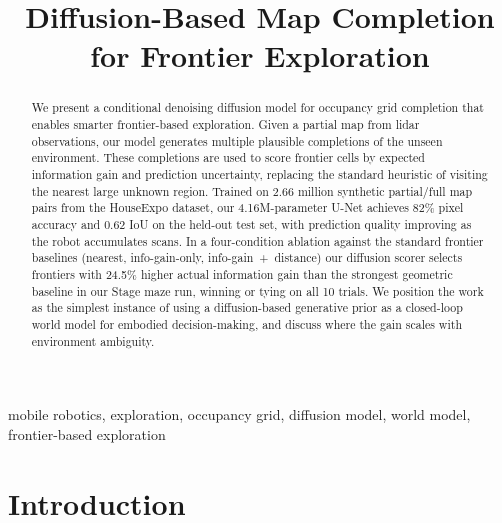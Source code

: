 \documentclass[conference]{IEEEtran}
\begin{document}
\title{Diffusion-Based Map Completion \\ for Frontier Exploration}

\author{
}

\maketitle

\begin{abstract}
We present a conditional denoising diffusion model for occupancy grid
completion that enables smarter frontier-based exploration. Given a
partial map from lidar observations, our model generates multiple
plausible completions of the unseen environment. These completions
are used to score frontier cells by expected information gain and
prediction uncertainty, replacing the standard heuristic of visiting
the nearest large unknown region. Trained on 2.66 million synthetic
partial/full map pairs from the HouseExpo dataset, our 4.16M-parameter
U-Net achieves 82\% pixel accuracy and 0.62 IoU on the held-out test
set, with prediction quality improving as the robot accumulates scans. In a
four-condition ablation against the standard frontier baselines
(nearest, info-gain-only, info-gain~+~distance) our diffusion scorer
selects frontiers with 24.5\% higher actual information gain than
the strongest geometric baseline in our Stage maze run, winning or
tying on all 10 trials. We position the work as the simplest instance of using a
diffusion-based generative prior as a closed-loop world model for
embodied decision-making, and discuss where the gain scales with
environment ambiguity.
\end{abstract}

\begin{IEEEkeywords}
mobile robotics, exploration, occupancy grid, diffusion model,
world model, frontier-based exploration
\end{IEEEkeywords}

\section{Introduction}
\end{document}
